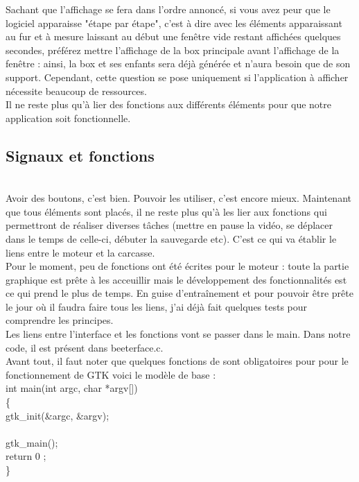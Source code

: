 \documentclass[11pt,french,a4paper]{report}
\begin{document}
Sachant que l'affichage se fera dans l'ordre annoncé, si vous avez peur que le logiciel apparaisse "étape par étape", c'est à 
dire avec les éléments apparaissant au fur et à mesure laissant au début une fenêtre vide restant affichées quelques secondes, 
préférez mettre l'affichage de la box principale avant l'affichage de la fenêtre : ainsi, la box et ses enfants sera déjà générée 
et n'aura besoin que de son support. Cependant, cette question se pose uniquement si l'application à afficher nécessite beaucoup de 
ressources. \\

Il ne reste plus qu'à lier des fonctions aux différents éléments pour que notre application soit 
fonctionnelle.\\
        
        \subsection{Signaux et fonctions} \\
Avoir des boutons, c'est bien. Pouvoir les utiliser, c'est encore mieux. Maintenant que tous éléments sont placés, 
il ne reste plus qu'à les lier aux fonctions qui permettront de réaliser diverses tâches (mettre en pause la vidéo,
se déplacer dans le temps de celle-ci, débuter la sauvegarde etc).    
C'est ce qui va établir le liens entre le moteur et la carcasse. \\

Pour le moment, peu de fonctions ont été écrites pour le moteur : toute la partie graphique est prête à les acceuillir 
mais le développement des fonctionnalités est ce qui prend le plus de temps. En guise d'entraînement et pour 
pouvoir être prête le jour où il faudra faire tous les liens, j'ai déjà fait quelques tests pour comprendre les principes. \\

Les liens entre l'interface et les fonctions vont se passer dans le main. Dans notre code, il est présent dans beeterface.c.\\

Avant tout, il faut noter que quelques fonctions de sont obligatoires pour pour le fonctionnement de GTK voici le modèle de base : \\

int main(int argc, char *argv[])    \\ 
\{ \\
 gtk\_init(&argc, &argv); \\
 [votre code] \\
 gtk\_main(); \\
 return 0 ; \\
\} \\
\end{document}
